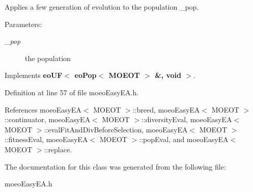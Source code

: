 Applies a few generation of evolution to the population \_\-pop. 

\begin{Desc}
\item[Parameters:]
\begin{description}
\item[{\em \_\-pop}]the population \end{description}
\end{Desc}


Implements {\bf eo\-UF$<$ eo\-Pop$<$ MOEOT $>$ \&, void $>$}.

Definition at line 57 of file moeo\-Easy\-EA.h.

References moeo\-Easy\-EA$<$ MOEOT $>$::breed, moeo\-Easy\-EA$<$ MOEOT $>$::continuator, moeo\-Easy\-EA$<$ MOEOT $>$::diversity\-Eval, moeo\-Easy\-EA$<$ MOEOT $>$::eval\-Fit\-And\-Div\-Before\-Selection, moeo\-Easy\-EA$<$ MOEOT $>$::fitness\-Eval, moeo\-Easy\-EA$<$ MOEOT $>$::pop\-Eval, and moeo\-Easy\-EA$<$ MOEOT $>$::replace.

The documentation for this class was generated from the following file:\begin{CompactItemize}
\item 
moeo\-Easy\-EA.h\end{CompactItemize}
